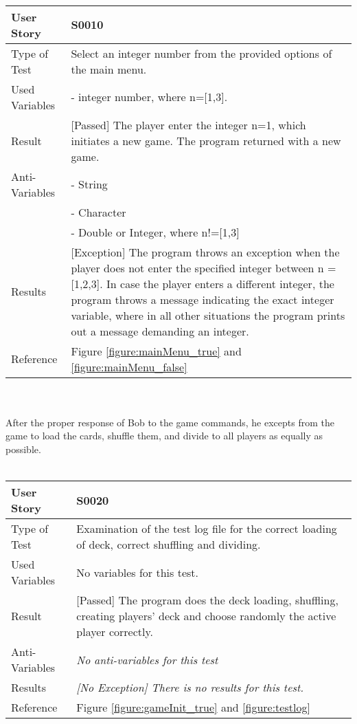 \vspace{0.2cm}\\
\begin{tabular}{l | p{12cm}}
User Story & \textbf{S0010}\\ \hline
Type of Test & Select an integer number from the provided options of the main menu.\\ \hline
Used Variables & - integer number, where n=[1,3].\\ \hline
Result & [Passed] The player enter the integer n=1, which initiates a new game. The program returned with a new game.\\ \hline
Anti-Variables & - String\\
& - Character\\
& - Double or Integer, where n!=[1,3]\\
\hline
Results & [Exception] The program throws an exception when the player does not enter the specified integer between n = [1,2,3]. In case the player enters a different integer, the program throws a message indicating the exact integer variable, where in all other situations the program prints out a message demanding an integer.\\ \hline 
Reference & Figure \ref{figure:mainMenu_true} and \ref{figure:mainMenu_false}\\ \hline
\end{tabular}\\
\vspace{0.2cm}\\
After the proper response of Bob to the game commands, he excepts from the game to load the cards, shuffle them, and divide to all players as equally as possible.\\
\vspace{0.2cm}\\
\begin{tabular}{l | p{12cm}}
User Story & \textbf{S0020}\\ \hline
Type of Test & Examination of the test log file for the correct loading of deck, correct shuffling and dividing.\\ \hline
Used Variables & No variables for this test.\\ \hline
Result & [Passed] The program does the deck loading, shuffling, creating players' deck and choose randomly the active player correctly. \\ \hline
Anti-Variables & \textit{No anti-variables for this test} \\ \hline
Results & \textit{[No Exception] There is no results for this test.} \\ \hline
Reference & Figure \ref{figure:gameInit_true} and \ref{figure:testlog}\\ \hline
\end{tabular}\\
